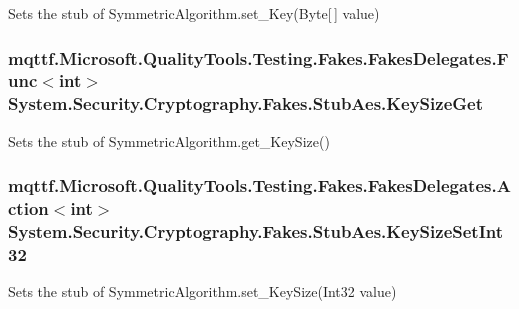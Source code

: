 Sets the stub of Symmetric\-Algorithm.\-set\-\_\-\-Key(\-Byte\mbox{[}$\,$\mbox{]} value)

\hypertarget{class_system_1_1_security_1_1_cryptography_1_1_fakes_1_1_stub_aes_a1c681b4f8d169b627d880f8f1f5a5eda}{
\subsubsection[{Key\-Size\-Get}]{\setlength{\rightskip}{0pt plus 5cm}mqttf.\-Microsoft.\-Quality\-Tools.\-Testing.\-Fakes.\-Fakes\-Delegates.\-Func$<$int$>$ System.\-Security.\-Cryptography.\-Fakes.\-Stub\-Aes.\-Key\-Size\-Get}}\label{class_system_1_1_security_1_1_cryptography_1_1_fakes_1_1_stub_aes_a1c681b4f8d169b627d880f8f1f5a5eda}


Sets the stub of Symmetric\-Algorithm.\-get\-\_\-\-Key\-Size()

\hypertarget{class_system_1_1_security_1_1_cryptography_1_1_fakes_1_1_stub_aes_ae6b6696aef9045cb88a0b87540a4bbf8}{
\subsubsection[{Key\-Size\-Set\-Int32}]{\setlength{\rightskip}{0pt plus 5cm}mqttf.\-Microsoft.\-Quality\-Tools.\-Testing.\-Fakes.\-Fakes\-Delegates.\-Action$<$int$>$ System.\-Security.\-Cryptography.\-Fakes.\-Stub\-Aes.\-Key\-Size\-Set\-Int32}}\label{class_system_1_1_security_1_1_cryptography_1_1_fakes_1_1_stub_aes_ae6b6696aef9045cb88a0b87540a4bbf8}


Sets the stub of Symmetric\-Algorithm.\-set\-\_\-\-Key\-Size(\-Int32 value)

